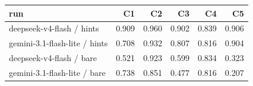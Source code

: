 \begin{tabular}{lrrrrr}
\toprule
run & C1 & C2 & C3 & C4 & C5 \\
\midrule
deepseek-v4-flash / hints & 0.909 & 0.960 & 0.902 & 0.839 & 0.906 \\
gemini-3.1-flash-lite / hints & 0.708 & 0.932 & 0.807 & 0.816 & 0.904 \\
deepseek-v4-flash / bare & 0.521 & 0.923 & 0.599 & 0.834 & 0.323 \\
gemini-3.1-flash-lite / bare & 0.738 & 0.851 & 0.477 & 0.816 & 0.207 \\
\bottomrule
\end{tabular}
